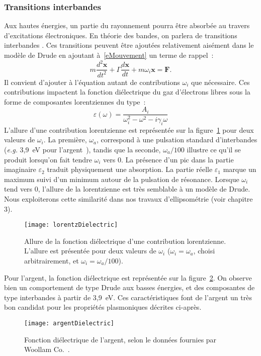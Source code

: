 		\subsubsection{Transitions interbandes}
Aux hautes énergies, un partie du rayonnement pourra être absorbée au travers d'excitations électroniques. En théorie des bandes, on parlera de \og transitions interbandes \fg. Ces transitions peuvent être ajoutées relativement aisément dans le modèle de Drude en ajoutant à~\ref{eMouvement} un terme de rappel~:	
\begin{equation}
m\dfrac{d^2\textbf{x}}{dt^2}+\Gamma\dfrac{d\textbf{x}}{dt}+m\omega_i\textbf{x} = \textbf{F}.
\end{equation}
Il convient d'ajouter à l'équation autant de contributions $\omega_i$ que nécessaire. Ces contributions impactent la fonction diélectrique du gaz d'électrons libres sous la forme de composantes
lorentziennes du type~:
\begin{equation}
\varepsilon(\omega) = \dfrac{A_i}{\omega_i^2-\omega^2-i\gamma_i\omega}
\end{equation}
L'allure d'une contribution lorentzienne est représentée sur la figure~\ref{lorentzDielectric} pour deux valeurs de $\omega_i$. La première, $\omega_a$, correspond à une pulsation standard d'interbandes (\textit{e.g.} 3,9~eV pour l'argent~\cite{oates2005evolution}), tandis que la seconde, $\omega_a/100$ illustre ce qu'il se produit lorsqu'on fait tendre $\omega_i$ vers 0. La présence d'un pic dans la partie imaginaire $\varepsilon_2$ traduit physiquement une absorption. La partie réelle $\varepsilon_1$ marque un maximum suivi d'un minimum autour de la pulsation de résonance. Lorsque $\omega_i$ tend vers 0, l'allure de la lorentzienne est très semblable à un modèle de Drude. Nous exploiterons cette similarité dans nos travaux d'ellipsométrie (voir chapitre 3). \par
\begin{figure}[!htb]
	\centering
	\texttt{[image: lorentzDielectric]}
	\caption{Allure de la fonction diélectrique d'une contribution lorentzienne. L'allure est
présentée pour deux valeurs de $\omega_i$ ($\omega_i=\omega_a$, choisi arbitrairement, et $\omega_i=\omega_a/100$).}
	\label{lorentzDielectric}
\end{figure}
Pour l'argent, la fonction diélectrique est représentée sur la figure~\ref{argentDielectric}. On observe bien un comportement de type Drude aux basses énergies, et des composantes de type interbandes à partir de 3,9~eV. Ces caractéristiques font de l'argent un très bon candidat pour les propriétés plasmoniques décrites ci-après.\par
\begin{figure}[!htb]
	\centering
	\texttt{[image: argentDielectric]}
	\caption{Fonction diélectrique de l'argent, selon le données fournies par Woollam Co.~\cite{herzinger1998ellipsometric}.}
	\label{argentDielectric}
\end{figure}
